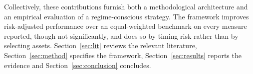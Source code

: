 Collectively, these contributions furnish both a methodological architecture and an
empirical evaluation of a regime-conscious strategy. The framework improves risk-adjusted
performance over an equal-weighted benchmark on every measure reported, though not
significantly, and does so by timing risk rather than by selecting assets.
Section~\ref{sec:lit} reviews the relevant literature, Section~\ref{sec:method} specifies
the framework, Section~\ref{sec:results} reports the evidence and
Section~\ref{sec:conclusion} concludes.

